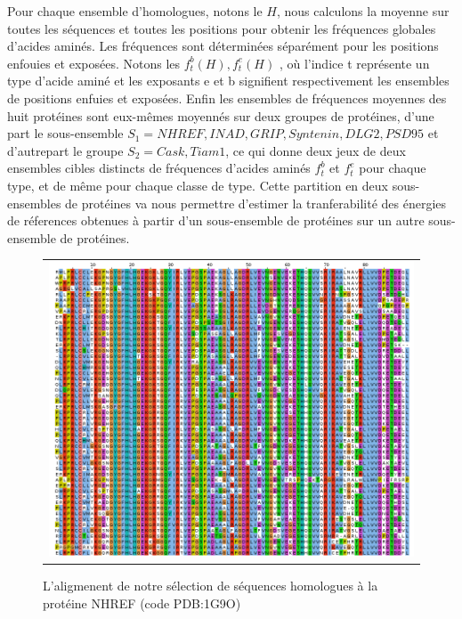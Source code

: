     Pour chaque ensemble d'homologues, notons le $H$, nous calculons la moyenne sur toutes les séquences et toutes les positions pour obtenir les fréquences globales d'acides aminés. Les fréquences sont déterminées séparément pour les positions enfouies et exposées. Notons les ${f^b_t(H),f^e_t(H)}$ , où l'indice t représente un type d'acide aminé et les exposants e et b signifient respectivement les ensembles de positions enfuies et exposées. Enfin les ensembles de fréquences moyennes des huit protéines sont eux-mêmes moyennés sur deux groupes de protéines, d'une part le sous-ensemble $S_1 = {NHREF,INAD,GRIP,Syntenin,DLG2,PSD95}$ et d'autrepart le groupe $S_2 ={Cask,Tiam1}$, ce qui donne deux jeux de deux  ensembles cibles distincts de fréquences d'acides aminés $f^b_t$ et $f^e_t$ pour chaque type, et de même pour chaque classe de type. Cette partition en deux sous-ensembles de protéines va nous permettre d'estimer la tranferabilité des énergies de réferences obtenues à partir d'un sous-ensemble de protéines sur un autre sous-ensemble de protéines.
\label{subsection:freqaa}
        
\clearpage

   \begin{figure}[t]
     \centering
     \begin{tabular}{c}
       \includegraphics[width=17cm]{homologues/1G9O.png} \\
     \end{tabular}
     \caption{L'aligmenent de notre sélection de séquences homologues à la protéine NHREF (code PDB:1G9O)}
\label{align_homo:NHREF}
   \end{figure}

